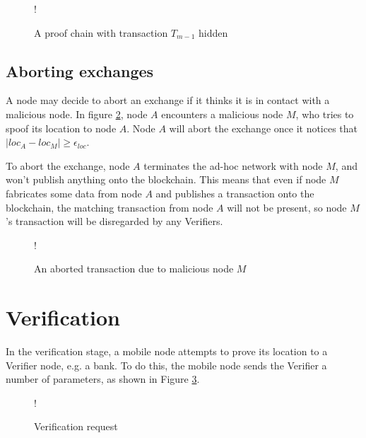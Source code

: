\begin{figure}[H]
\begin{center}
\resizebox {\columnwidth} {!} {}
\caption{A proof chain with transaction $T_{m-1}$ hidden}
\label{fig:link}
\end{center}
\end{figure}

\subsection{Aborting exchanges} \label{ssec:aborting_exchanges}
A node may decide to abort an exchange if it thinks it is in contact with a malicious node. In figure \ref{fig:aborted_transaction}, node $A$ encounters a malicious node $M$, who tries to spoof its location to node $A$. Node $A$ will abort the exchange once it notices that $|loc_A-loc_M| \geq \epsilon_{loc}$.

To abort the exchange, node $A$ terminates the ad-hoc network with node $M$, and won't publish anything onto the blockchain. This means that even if node $M$ fabricates some data from node $A$ and publishes a transaction onto the blockchain, the matching transaction from node $A$ will not be present, so node $M$'s transaction will be disregarded by any Verifiers.

\begin{figure}
\resizebox {\columnwidth} {!} {}
\caption{An aborted transaction due to malicious node $M$}
\label{fig:aborted_transaction}
\end{figure}

\clearpage
\section{Verification} \label{ssec:verification}
In the verification stage, a mobile node attempts to prove its location to a Verifier node, e.g. a bank. To do this, the mobile node sends the Verifier a number of parameters, as shown in Figure \ref{fig:verify_request}.

\begin{figure}[H]
\begin{center}
 {!} {}
\caption{Verification request}
\label{fig:verify_request}
\end{center}
\end{figure}

